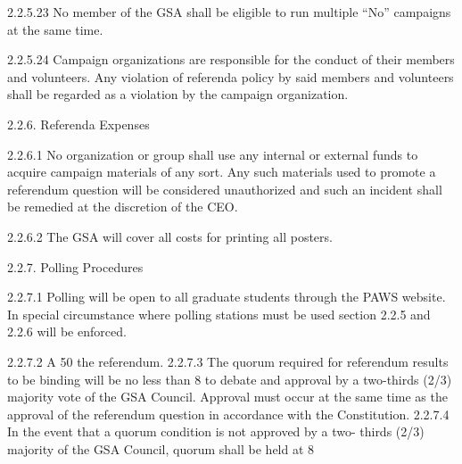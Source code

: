  2.2.5.23 No member of the GSA shall be eligible to run multiple “No” 
 campaigns at the same time. 
 
 2.2.5.24 Campaign organizations are responsible for the conduct of their members and volunteers. Any violation of referenda policy by 
 said members and volunteers shall be regarded as a violation by 
 the campaign organization. 
 
 2.2.6. Referenda Expenses 
 
 2.2.6.1 No organization or group shall use any internal or external funds 
 to acquire campaign materials of any sort. Any such materials 
 used to promote a referendum question will be considered 
 unauthorized and such an incident shall be remedied at the 
 discretion of the CEO. 
 
 2.2.6.2 The GSA will cover all costs for printing all posters. 
 
 2.2.7. Polling Procedures 
 
 2.2.7.1 Polling will be open to all graduate students through the PAWS 
 website. In special circumstance where polling stations must be 
 used section 2.2.5 and 2.2.6 will be enforced. 
 
 2.2.7.2 A 50%
 the referendum. 
 2.2.7.3 The quorum required for referendum results to be binding will be 
 no less than 8%
 to debate and approval by a two-thirds (2/3) majority vote of the 
 GSA Council. Approval must occur at the same time as the 
 approval of the referendum question in accordance with the 
 Constitution. 
 2.2.7.4 In the event that a quorum condition is not approved by a two- 
 thirds (2/3) majority of the GSA Council, quorum shall be held at 
 8%